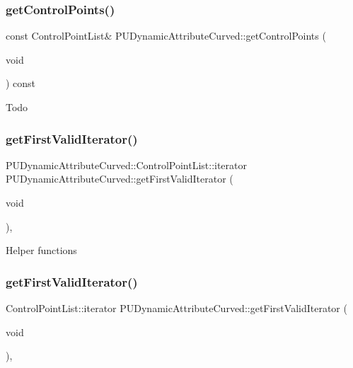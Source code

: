 \subsubsection{\texorpdfstring{get\+Control\+Points()}{getControlPoints()}\hspace{0.1cm}{\footnotesize\ttfamily [2/2]}}
{\footnotesize\ttfamily const Control\+Point\+List\& P\+U\+Dynamic\+Attribute\+Curved\+::get\+Control\+Points (\begin{DoxyParamCaption}\item[{void}]{ }\end{DoxyParamCaption}) const}

Todo \mbox{\label{classPUDynamicAttributeCurved_aa068c48bd9d0cb3c6154d1382d5ed8c3}} 
\subsubsection{\texorpdfstring{get\+First\+Valid\+Iterator()}{getFirstValidIterator()}\hspace{0.1cm}{\footnotesize\ttfamily [1/2]}}
{\footnotesize\ttfamily P\+U\+Dynamic\+Attribute\+Curved\+::\+Control\+Point\+List\+::iterator P\+U\+Dynamic\+Attribute\+Curved\+::get\+First\+Valid\+Iterator (\begin{DoxyParamCaption}\item[{void}]{ }\end{DoxyParamCaption})\hspace{0.3cm}{\ttfamily [inline]}, {\ttfamily [protected]}}

Helper functions \mbox{\label{classPUDynamicAttributeCurved_a9c93266e42134d30e5b3bb20533f42ef}} 
\subsubsection{\texorpdfstring{get\+First\+Valid\+Iterator()}{getFirstValidIterator()}\hspace{0.1cm}{\footnotesize\ttfamily [2/2]}}
{\footnotesize\ttfamily Control\+Point\+List\+::iterator P\+U\+Dynamic\+Attribute\+Curved\+::get\+First\+Valid\+Iterator (\begin{DoxyParamCaption}\item[{void}]{ }\end{DoxyParamCaption})\hspace{0.3cm}{\ttfamily [inline]}, {\ttfamily [protected]}}

